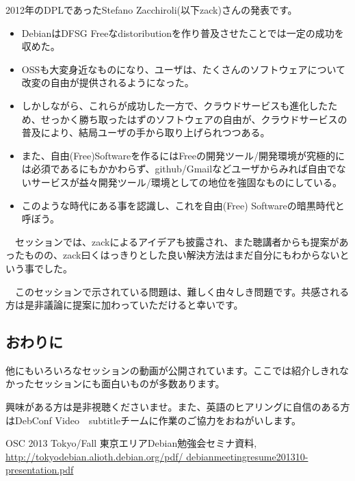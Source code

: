 \documentclass[mingoth,a4paper]{jsarticle}
\begin{document}
 2012年のDPLであったStefano Zacchiroli(以下zack)さんの発表です。

 \begin{itemize}
  \item DebianはDFSG Freeなdistoributionを作り普及させたことでは一定の成功を収めた。
　\item OSSも大変身近なものになり、ユーザは、たくさんのソフトウェアについて改変の自由が提供されるようになった。
  \item しかしながら、これらが成功した一方で、クラウドサービスも進化したため、せっかく勝ち取ったはずのソフトウェアの自由が、クラウドサービスの普及により、結局ユーザの手から取り上げられつつある。
 \item また、自由(Free)Softwareを作るにはFreeの開発ツール/開発環境が究極的には必須であるにもかかわらず、github/Gmailなどユーザからみれば自由でないサービスが益々開発ツール/環境としての地位を強固なものにしている。
 \end{itemize}

 \begin{itemize}
 \item このような時代にある事を認識し、これを自由(Free) Softwareの暗黒時代と呼ぼう。
\end{itemize}

　セッションでは、zackによるアイデアも披露され、また聴講者からも提案があったものの、zack曰くはっきりとした良い解決方法はまだ自分にもわからないという事でした。
 
　このセッションで示されている問題は、難しく由々しき問題です。共感される方は是非議論に提案に加わっていただけると幸いです。

\subsection{おわりに}

 他にもいろいろなセッションの動画が公開されています。ここでは紹介しきれなかったセッションにも面白いものが多数あります。

 興味がある方は是非視聴くださいませ。また、英語のヒアリングに自信のある方はDebConf Video　subtitleチームに作業のご協力をおねがいします。

\begin{thebibliography}{9}
OSC 2013 Tokyo/Fall 東京エリアDebian勉強会セミナ資料, \url{http://tokyodebian.alioth.debian.org/pdf/ debianmeetingresume201310-presentation.pdf}
\end{thebibliography}

\end{document}
